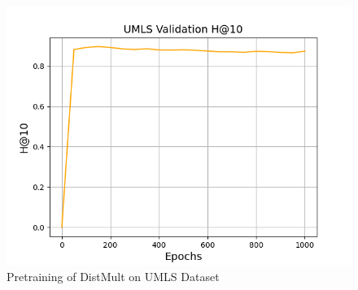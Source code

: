 \begin{figure}
\begin{minipage}{.3\textwidth}
    \end{minipage}
    \begin{minipage}{.3\textwidth}
      \centering
      \includegraphics[width=0.9\linewidth]{figures/results/UMLS/Pretraining/DistMult/pretrain_umls_hit10.png}
    \end{minipage}%
    \caption{Pretraining of DistMult on UMLS Dataset}
    \label{fig:test}
\end{figure}

